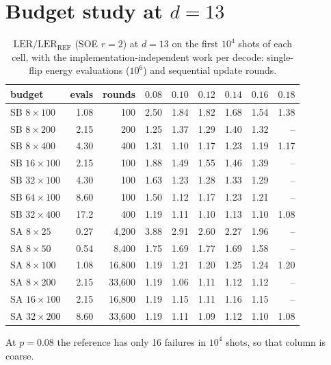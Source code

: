\documentclass[journal]{IEEEtran}
\newcommand{\REF}{\mathrm{REF}}
\newcommand{\LER}{\mathrm{LER}}
\begin{document}
\section{Budget study at $d=13$}
\label{app:budget}
\begin{table}[h]
\centering
\caption{$\LER/\LER_\REF$ (SOE $r=2$) at $d=13$ on the first $10^4$ shots of each cell, with the implementation-independent work per decode: single-flip energy evaluations ($10^6$) and sequential update rounds.}
\label{tab:budget}
\footnotesize
\setlength{\tabcolsep}{3pt}
\begin{tabular}{lrrrrrrrr}
\toprule
budget & evals & rounds & $0.08$ & $0.10$ & $0.12$ & $0.14$ & $0.16$ & $0.18$\\
\midrule
SB $8\times100$ & 1.08 & 100 & 2.50 & 1.84 & 1.82 & 1.68 & 1.54 & 1.38\\
SB $8\times200$ & 2.15 & 200 & 1.25 & 1.37 & 1.29 & 1.40 & 1.32 & --\\
SB $8\times400$ & 4.30 & 400 & 1.31 & 1.10 & 1.17 & 1.23 & 1.19 & 1.17\\
SB $16\times100$ & 2.15 & 100 & 1.88 & 1.49 & 1.55 & 1.46 & 1.39 & --\\
SB $32\times100$ & 4.30 & 100 & 1.63 & 1.23 & 1.28 & 1.33 & 1.29 & --\\
SB $64\times100$ & 8.60 & 100 & 1.50 & 1.12 & 1.17 & 1.23 & 1.21 & --\\
SB $32\times400$ & 17.2 & 400 & 1.19 & 1.11 & 1.10 & 1.13 & 1.10 & 1.08\\
\midrule
SA $8\times25$ & 0.27 & 4{,}200 & 3.88 & 2.91 & 2.60 & 2.27 & 1.96 & --\\
SA $8\times50$ & 0.54 & 8{,}400 & 1.75 & 1.69 & 1.77 & 1.69 & 1.58 & --\\
SA $8\times100$ & 1.08 & 16{,}800 & 1.19 & 1.21 & 1.20 & 1.25 & 1.24 & 1.20\\
SA $8\times200$ & 2.15 & 33{,}600 & 1.19 & 1.06 & 1.11 & 1.12 & 1.12 & --\\
SA $16\times100$ & 2.15 & 16{,}800 & 1.19 & 1.15 & 1.11 & 1.16 & 1.15 & --\\
SA $32\times200$ & 8.60 & 33{,}600 & 1.19 & 1.11 & 1.09 & 1.12 & 1.10 & 1.08\\
\bottomrule
\end{tabular}
\end{table}
At $p=0.08$ the reference has only 16 failures in $10^4$ shots, so that column is coarse.
\end{document}
